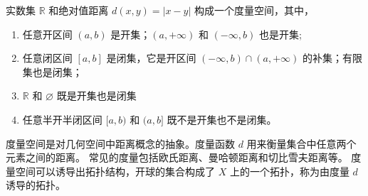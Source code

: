 \begin{example}
    实数集 $\mathbb{R}$ 和绝对值距离 $ d(x,y)=|x-y| $ 构成一个度量空间，其中，
    \begin{enumerate}
        \item 任意开区间 $ (a,b) $ 是开集；$(a,+\infty)$ 和 $(-\infty,b)$ 也是开集;
        \item 任意闭区间 $ [a,b] $ 是闭集，它是开区间 $(-\infty,b)\cap(a,+\infty)$ 的补集；有限集也是闭集；
        \item $\mathbb{R}$ 和 $\varnothing$ 既是开集也是闭集
        \item 任意半开半闭区间 $ [a,b) $ 和 $ (a,b] $ 既不是开集也不是闭集。
    \end{enumerate}
\end{example}

\vspace{1em}

\begin{note}
    度量空间是对几何空间中距离概念的抽象。度量函数 $ d $ 用来衡量集合中任意两个元素之间的距离。
    常见的度量包括欧氏距离、曼哈顿距离和切比雪夫距离等。
    度量空间可以诱导出拓扑结构，开球的集合构成了 $ X $ 上的一个拓扑，称为由度量 $ d $ 诱导的拓扑。
\end{note}

\newpage